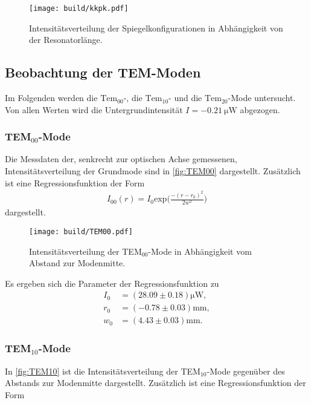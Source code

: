 \begin{figure}[H]
  \centering
  \texttt{[image: build/kkpk.pdf]}
  \caption {Intensitätsverteilung der Spiegelkonfigurationen in Abhängigkeit von der Resonatorlänge.}
  \label{fig:kkpk}
\end{figure}

\subsection{Beobachtung der TEM-Moden}
\label{subsec:Moden_aus}
Im Folgenden werden die $\text{Tem}_{00}$-, die $\text{Tem}_{10}$- und die $\text{Tem}_{20}$-Mode untersucht. Von allen Werten wird die Untergrundintensität $I = \qty{-0.21}{\micro\watt}$ abgezogen.

\subsubsection{TEM$_{00}$-Mode}
\label{subsubsec:00Mode}
Die Messdaten der, senkrecht zur optischen Achse gemessenen, Intensitätsverteilung der Grundmode sind in \autoref{fig:TEM00} dargestellt.
Zusätzlich ist eine Regressionsfunktion der Form
\begin{align*}
  I_{00}(r) = I_0 \text{exp}\Biggl(\frac{-(r-r_0)^2}{2 w^2}\Biggr)
\end{align*}
dargestellt.

\begin{figure}[H]
  \centering
  \texttt{[image: build/TEM00.pdf]}
  \caption {Intensitätsverteilung der TEM$_{00}$-Mode in Abhängigkeit vom Abstand zur Modenmitte.}
  \label{fig:TEM00}
\end{figure}

Es ergeben sich die Parameter der Regressionsfunktion zu
\begin{align*}
  I_{0} &= (28.09 \pm 0.18) \si{\micro\W},\\
  r_0 &= (-0.78 \pm 0.03) \si{\milli\meter},\\
  w_0 &= (4.43 \pm 0.03) \si{\milli\meter}.
  \label{eqn:Para00}
\end{align*}


\subsubsection{TEM$_{10}$-Mode}
\label{subsubsec:10Mode}
In \autoref{fig:TEM10} ist die Intensitätsverteilung der TEM$_{10}$-Mode gegenüber des Abstands zur Modenmitte dargestellt. Zusätzlich ist eine Regressionsfunktion der Form

